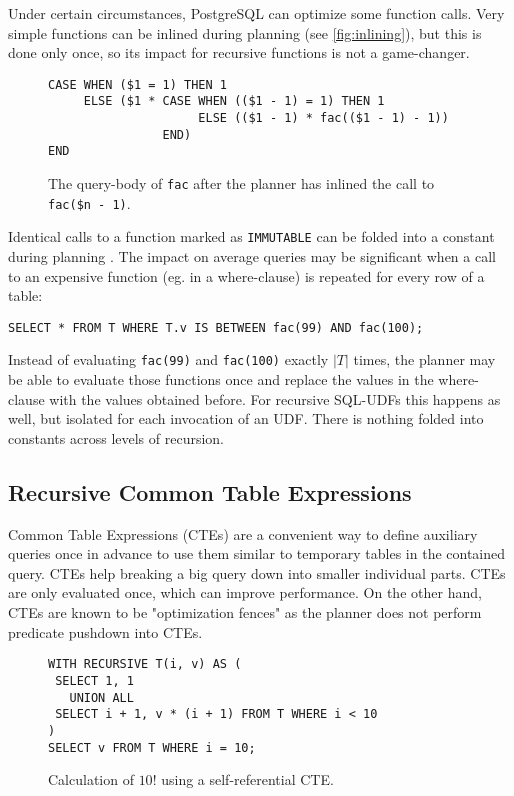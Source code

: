 Under certain circumstances, PostgreSQL can optimize some function calls. Very simple functions can be inlined during planning \cite{psqlWikiUDFinlining} (see \autoref{fig:inlining}), but this is done only once, so its impact for recursive functions is not a game-changer.


\begin{figure}[h!]
    \centering
    \begin{verbatim}
CASE WHEN ($1 = 1) THEN 1
     ELSE ($1 * CASE WHEN (($1 - 1) = 1) THEN 1
                     ELSE (($1 - 1) * fac(($1 - 1) - 1))
                END)
END
    \end{verbatim}
    \caption{The query-body of \texttt{fac} after the planner has inlined the call to \texttt{fac(\$n - 1)}.}
    \label{fig:inlining}
\end{figure}

Identical calls to a function marked as \texttt{IMMUTABLE} can be folded into a constant during planning \cite[p. 995]{psql}. The impact on average queries may be significant when a call to an expensive function (eg. in a where-clause) is repeated for every row of a table:\\
\begin{verbatim}
SELECT * FROM T WHERE T.v IS BETWEEN fac(99) AND fac(100);
\end{verbatim}
Instead of evaluating \texttt{fac(99)} and \texttt{fac(100)} exactly $|T|$ times, the planner may be able to evaluate those functions once and replace the values in the where-clause with the values obtained before. For recursive SQL-UDFs this happens as well, but isolated for each invocation of an UDF. There is nothing folded into constants across levels of recursion.

\subsection{Recursive Common Table Expressions}

Common Table Expressions (CTEs) are a convenient way to define auxiliary queries once in advance to use them similar to temporary tables in the contained query. CTEs help breaking a big query down into smaller individual parts. CTEs are only evaluated once, which can improve performance. On the other hand, CTEs are known to be "optimization fences" as the planner does not perform predicate pushdown into CTEs.


\begin{figure}[h!]
    \centering
    \begin{verbatim}
WITH RECURSIVE T(i, v) AS (
 SELECT 1, 1
   UNION ALL
 SELECT i + 1, v * (i + 1) FROM T WHERE i < 10
)
SELECT v FROM T WHERE i = 10;
    \end{verbatim}
    \caption{Calculation of $10!$ using a self-referential CTE.}
    \label{fig:my_label}
\end{figure}


